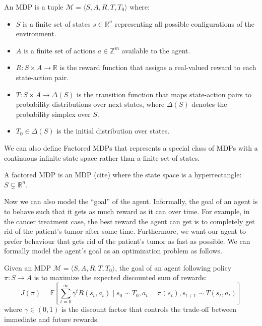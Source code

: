 \begin{definition} An MDP is a tuple $\mathcal{M} = \langle S, A, R, T, T_0 \rangle$ where:
\begin{itemize}
\item $S$ is a finite set of states $s \in \mathbb{R}^n$ representing all possible configurations of the environment.
\item $A$ is a finite set of actions $a \in \mathbb{Z}^m$ available to the agent.
\item $R: S \times A \rightarrow \mathbb{R}$ is the reward function that assigns a real-valued reward to each state-action pair.
\item $T: S \times A \rightarrow \Delta(S)$ is the transition function that maps state-action pairs to probability distributions over next states, where $\Delta(S)$ denotes the probability simplex over $S$.
\item $T_0 \in \Delta(S)$ is the initial distribution over states.
\end{itemize}
\end{definition}
We can also define Factored MDPs that represents a special class of MDPs with a continuous infinite state space rather than a finite set of states.

\begin{definition} A factored MDP is an MDP (cite) where the state space is a hyperrectangle: $S\subsetneq \mathbb{R}^n$.
\end{definition}

Now we can also model the ``goal'' of the agent. Informally, the goal of an agent is to behave such that it gets as much reward as it can over time. For example, in the cancer treatment case, the best reward the agent can get is to completely get rid of the patient's tumor after some time. Furthermore, we want our agent to prefer behaviour that gets rid of the patient's tumor as fast as possible. We can formally model the agent's goal as an optimization problem as follows. %
\begin{definition} Given an MDP $\mathcal{M}=\langle S, A, R, T, T_0 \rangle$, the goal of an agent following policy $\pi: S \rightarrow A$ is to maximize the expected discounted sum of rewards:
$$J(\pi) = \mathbb{E}\left[\sum_{t=0}^{\infty} \gamma^t R(s_t, a_t) \mid s_0 \sim T_0, a_t = \pi(s_t), s_{t+1} \sim T(s_t, a_t)\right]$$
where $\gamma \in (0,1)$ is the discount factor that controls the trade-off between immediate and future rewards.
\end{definition}


